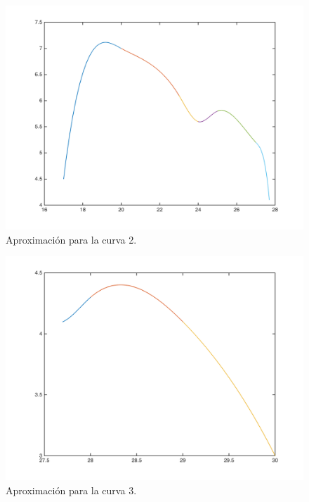 \documentclass[11pt, spanish]{article}
\begin{document}
\begin{figure}[!hbt]
\centering
	\includegraphics[scale=0.6]{data/img/curve2}
	\caption{Aproximación para la curva 2.}
\end{figure}

\begin{figure}[!hbt]
\centering
	\includegraphics[scale=0.6]{data/img/curve3}
	\caption{Aproximación para la curva 3.}
\end{figure}
\end{document}
